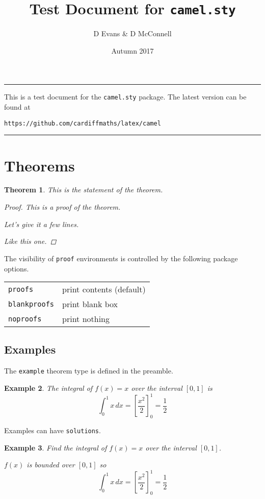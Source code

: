 \documentclass{article}
\title{Test Document for \texttt{camel.sty}}
\author{D Evans \& D McConnell}
\date{Autumn 2017}
\theoremstyle{break}
\newcounter{theorem}
\newtheorem{theorem}{Theorem}
\newtheorem{example}[theorem]{Example}
\begin{document}
\maketitle
\tableofcontents
\bigskip
\hrule
\begin{center}
This is a test document for the {\tt camel.sty} package. The latest version can be found at
\par
\texttt{https://github.com/cardiffmaths/latex/camel}
\end{center}
\hrule

\section{Theorems}

\begin{theorem}\label{thm:test}
This is the statement of the theorem.
\begin{proof}
This is a proof of the theorem.\par
Let's give it a few lines.\par
Like this one.
\end{proof}
\end{theorem}

The visibility of {\tt proof} environments is controlled by the following package options.

\bigskip
\begin{tabular}{ll}
\hline
{\tt proofs}		& print contents (default) \\
{\tt blankproofs}	& print blank box \\
{\tt noproofs}		& print nothing \\
\hline
\end{tabular}
\bigskip

\subsection{Examples}
The {\tt example} theorem type is defined in the preamble.

\begin{example}
The integral of $f(x)=x$ over the interval $[0,1]$ is
\[
\int_0^1 x\,dx = \left[\frac{x^2}{2}\right]_0^1 = \frac{1}{2}
\]
\end{example}

Examples can have {\tt solutions}.
\begin{example}
Find the integral of $f(x)=x$ over the interval $[0,1]$.
\begin{solution}
$f(x)$ is bounded over $[0,1]$ so 
\[
\int_0^1 x\,dx = \left[\frac{x^2}{2}\right]_0^1 = \frac{1}{2}
\]
\end{solution}
\end{example}
\end{document}
